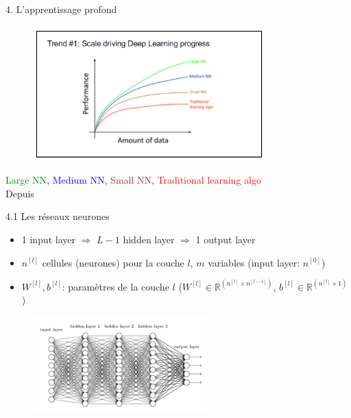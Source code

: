 \begin{frame}{4. L'apprentissage profond}
  \begin{figure}
    \includegraphics[width=0.8\textwidth]{fig/dataPerfAlgo.PNG}
  \end{figure}
  \vspace{-1cm}
  \begin{center}
    \footnotesize
    \textcolor{green}{Large NN}, \textcolor{blue}{Medium NN}, \textcolor{brown}{Small NN}, \textcolor{red}{Traditional learning algo}\\
    \vspace{0.1cm}
    \scriptsize
    Depuis \href{https://www.coursera.org/specializations/deep-learning}{\color{blue}{deeplearning.ai coursera}}
  \end{center}
\end{frame}
  
\begin{frame}{4.1 Les réseaux neurones}
  \begin{itemize}
  \item 1 input layer $\Rightarrow$  $L-1$ hidden layer $\Rightarrow$ 1 output layer
  \item $n^{[l]}$ cellules (neurones) pour la couche $l$, $m$ variables (input layer: $n^{[0]}$)
  \item $W^{[l]}, b^{[l]}$: paramètres de la couche $l$ ($W^{[l]} \in \mathbb{R}^{(n^{[l]} \times n^{[l-1]})}$, $b^{[l]} \in \mathbb{R}^{(n^{[l]} \times 1)}$)
  \end{itemize}
  \begin{figure}
    \includegraphics[width=0.6\textwidth]{fig/deepNN.png}
  \end{figure}
\end{frame}

